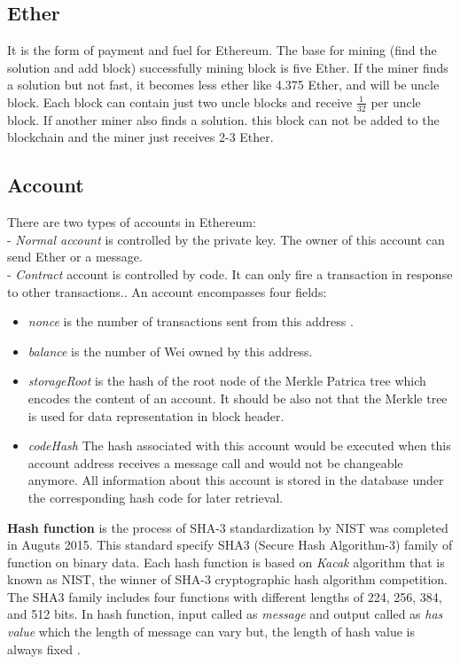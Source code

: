 \subsection{Ether}
 It is the form of payment and fuel for Ethereum. The base for mining (find the solution and add block) successfully mining block is five Ether. If the miner finds a solution but not fast, it becomes less ether like 4.375 Ether, and will be uncle block. Each block can contain just two uncle blocks and receive $\frac{1}{32}$ per uncle block. If another miner also finds a solution. this block can not be added to the blockchain and the miner just receives 2-3 Ether\cite{Egbertsen}. 
\subsection{Account}
There are two types of accounts in Ethereum:\\
- \textit{Normal account} is controlled by the private key. The owner of this account can send Ether or a message.\\
- \textit{Contract} account is controlled by code. It can only fire a transaction in response to other transactions.\cite{Egbertsen}. An account encompasses four fields:\\
 \begin{itemize}
     \item \textit{nonce} is the number of transactions sent from this address \cite{Gavin}.
     \item \textit{balance} is the number of Wei owned by this address\cite{Gavin}.
     \item \textit{storageRoot} is the hash of the root node of the Merkle Patrica tree which encodes the content of an account. It should be also not that the Merkle tree is used for data representation in block header\cite{Gavin}.
     \item \textit{codeHash}
     The hash associated with this account would be executed when this account address receives a message call and would not be changeable anymore. All information about this account is stored in the database under the corresponding hash code for later retrieval\cite{Gavin}. \\
    
\end{itemize}
\textbf{Hash function}
is the process of SHA-3 standardization by NIST was completed in Auguts 2015.
This standard specify SHA3 (Secure Hash Algorithm-3) family of function on binary data. Each hash function is based on \textit{Kacak} algorithm that is known as NIST, the winner of SHA-3 cryptographic hash algorithm competition. The SHA3 family includes four functions with different lengths of 224, 256, 384, and 512 bits. 
In hash function, input called as \textit{message} and output called as  \textit{has value} which the length of message can vary but, the length of hash value is always fixed \cite{Fips}.\\

